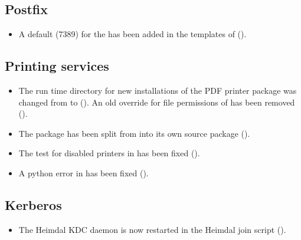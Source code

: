 \subsection{Postfix}
\begin{itemize}
\item A default (7389) for the  has been
  added in the \ucsUCR{} templates of
   ().
\end{itemize}


\subsection{Printing services}
\begin{itemize}
\item The run time directory for new installations of the PDF printer
  package was changed from  to
   (). An old override for
  file permissions of  has been removed
  ().

\item The package  has been split
  from  into its own source
  package ().

\item The test for disabled printers in
   has been fixed ().

\item A python error in  has been fixed
  ().
\end{itemize}

\subsection{Kerberos}
\begin{itemize}
\item The Heimdal KDC daemon is now restarted in the Heimdal join
  script ().
\end{itemize}

